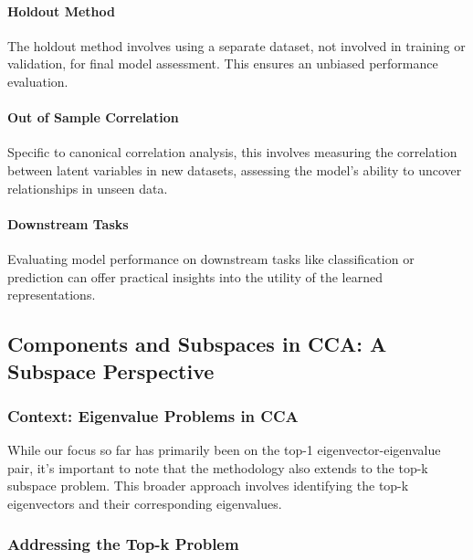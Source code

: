 \paragraph{Holdout Method}

The holdout method involves using a separate dataset, not involved in training or validation, for final model assessment. This ensures an unbiased performance evaluation.

\paragraph{Out of Sample Correlation}

Specific to canonical correlation analysis, this involves measuring the correlation between latent variables in new datasets, assessing the model's ability to uncover relationships in unseen data.

\paragraph{Downstream Tasks}

Evaluating model performance on downstream tasks like classification or prediction can offer practical insights into the utility of the learned representations.

\subsection{Components and Subspaces in CCA: A Subspace Perspective}

\subsubsection{Context: Eigenvalue Problems in CCA}\label{subsec:orthogonality}

While our focus so far has primarily been on the top-1 eigenvector-eigenvalue pair, it's important to note that the methodology also extends to the top-k subspace problem. This broader approach involves identifying the top-k eigenvectors and their corresponding eigenvalues.

\subsubsection{Addressing the Top-k Problem}

